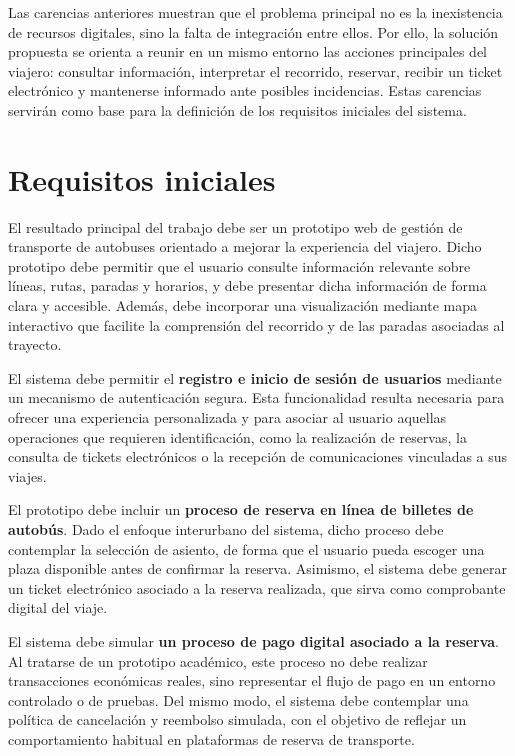 Las carencias anteriores muestran que el problema principal no es la inexistencia de recursos digitales, sino la falta de integración entre ellos. Por ello, la solución propuesta se orienta a reunir en un mismo entorno las acciones principales del viajero: consultar información, interpretar el recorrido, reservar, recibir un ticket electrónico y mantenerse informado ante posibles incidencias. Estas carencias servirán como base para la definición de los requisitos iniciales del sistema.


\section{Requisitos iniciales}
\label{sec:requisitos-iniciales}

El resultado principal del trabajo debe ser un prototipo web de gestión de transporte de autobuses orientado a mejorar la experiencia del viajero. Dicho prototipo debe permitir que el usuario consulte información relevante sobre líneas, rutas, paradas y horarios, y debe presentar dicha información de forma clara y accesible. Además, debe incorporar una visualización mediante mapa interactivo que facilite la comprensión del recorrido y de las paradas asociadas al trayecto.

El sistema debe permitir el \textbf{registro e inicio de sesión de usuarios} mediante un mecanismo de autenticación segura. Esta funcionalidad resulta necesaria para ofrecer una experiencia personalizada y para asociar al usuario aquellas operaciones que requieren identificación, como la realización de reservas, la consulta de tickets electrónicos o la recepción de comunicaciones vinculadas a sus viajes.

El prototipo debe incluir un \textbf{proceso de reserva en línea de billetes de autobús}. Dado el enfoque interurbano del sistema, dicho proceso debe contemplar la selección de asiento, de forma que el usuario pueda escoger una plaza disponible antes de confirmar la reserva. Asimismo, el sistema debe generar un ticket electrónico asociado a la reserva realizada, que sirva como comprobante digital del viaje.

El sistema debe simular \textbf{un proceso de pago digital asociado a la reserva}. Al tratarse de un prototipo académico, este proceso no debe realizar transacciones económicas reales, sino representar el flujo de pago en un entorno controlado o de pruebas. Del mismo modo, el sistema debe contemplar una política de cancelación y reembolso simulada, con el objetivo de reflejar un comportamiento habitual en plataformas de reserva de transporte.

